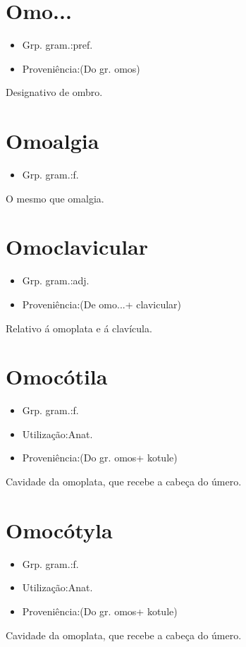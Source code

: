 \section{Omo...}
\begin{itemize}
\item {Grp. gram.:pref.}
\end{itemize}
\begin{itemize}
\item {Proveniência:(Do gr. \textunderscore omos\textunderscore )}
\end{itemize}
Designativo de \textunderscore ombro\textunderscore .
\section{Omoalgia}
\begin{itemize}
\item {Grp. gram.:f.}
\end{itemize}
O mesmo que \textunderscore omalgia\textunderscore .
\section{Omoclavicular}
\begin{itemize}
\item {Grp. gram.:adj.}
\end{itemize}
\begin{itemize}
\item {Proveniência:(De \textunderscore omo...\textunderscore  + \textunderscore clavicular\textunderscore )}
\end{itemize}
Relativo á omoplata e á clavícula.
\section{Omocótila}
\begin{itemize}
\item {Grp. gram.:f.}
\end{itemize}
\begin{itemize}
\item {Utilização:Anat.}
\end{itemize}
\begin{itemize}
\item {Proveniência:(Do gr. \textunderscore omos\textunderscore  + \textunderscore kotule\textunderscore )}
\end{itemize}
Cavidade da omoplata, que recebe a cabeça do úmero.
\section{Omocótyla}
\begin{itemize}
\item {Grp. gram.:f.}
\end{itemize}
\begin{itemize}
\item {Utilização:Anat.}
\end{itemize}
\begin{itemize}
\item {Proveniência:(Do gr. \textunderscore omos\textunderscore  + \textunderscore kotule\textunderscore )}
\end{itemize}
Cavidade da omoplata, que recebe a cabeça do úmero.
